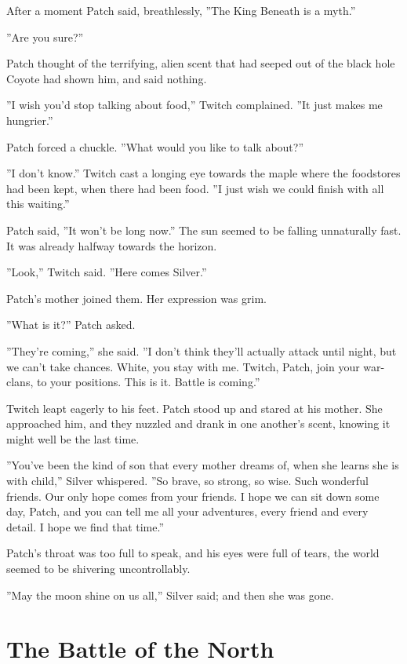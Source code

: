 \documentclass[12pt]{book}
\begin{document}
After a moment Patch said, breathlessly, ''The King Beneath is a
myth.''

''Are you sure?''

Patch thought of the terrifying, alien scent that had seeped out of
the black hole Coyote had shown him, and said nothing.

''I wish you'd stop talking about food,'' Twitch complained. ''It just
makes me hungrier.''

Patch forced a chuckle. ''What would you like to talk about?''

''I don't know.'' Twitch cast a longing eye towards the maple where
the foodstores had been kept, when there had been food. ''I just wish
we could finish with all this waiting.''

Patch said, ''It won't be long now.'' The sun seemed to be falling
unnaturally fast. It was already halfway towards the horizon.

''Look,'' Twitch said. ''Here comes Silver.''

Patch's mother joined them. Her expression was grim.

''What is it?'' Patch asked.

''They're coming,'' she said. ''I don't think they'll actually attack
until night, but we can't take chances. White, you stay with
me. Twitch, Patch, join your war-clans, to your positions. This is
it. Battle is coming.''

Twitch leapt eagerly to his feet. Patch stood up and stared at his
mother. She approached him, and they nuzzled and drank in one
another's scent, knowing it might well be the last time.

''You've been the kind of son that every mother dreams of, when she
learns she is with child,'' Silver whispered. ''So brave, so strong,
so wise. Such wonderful friends. Our only hope comes from your
friends. I hope we can sit down some day, Patch, and you can tell me
all your adventures, every friend and every detail. I hope we find
that time.''

Patch's throat was too full to speak, and his eyes were full of tears,
the world seemed to be shivering uncontrollably.

''May the moon shine on us all,'' Silver said; and then she was gone.


\section{The Battle of the North}
\end{document}
